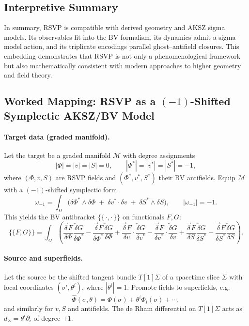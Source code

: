\documentclass[12pt]{article}
\begin{document}
\subsection{Interpretive Summary}
In summary, RSVP is compatible with derived geometry and AKSZ sigma models. Its observables fit into the BV formalism, its dynamics admit a sigma-model action, and its triplicate encodings parallel ghost–antifield closures. This embedding demonstrates that RSVP is not only a phenomenological framework but also mathematically consistent with modern approaches to higher geometry and field theory.

\subsection*{Worked Mapping: RSVP as a $(-1)$-Shifted Symplectic AKSZ/BV Model}

\paragraph{Target data (graded manifold).}
Let the target be a graded manifold $\mathcal M$ with degree assignments
\[
|\Phi|=|v|=|S|=0,\qquad
|\Phi^\ast|=|v^\ast|=|S^\ast|=-1,
\]
where $(\Phi,v,S)$ are RSVP fields and $(\Phi^\ast,v^\ast,S^\ast)$ their BV antifields. Equip $\mathcal M$ with a $(-1)$-shifted symplectic form
\begin{equation}
\omega_{-1}
=\int_\Omega \big(\delta \Phi^\ast \wedge \delta \Phi
\;+\; \delta v^\ast \!\cdot\! \delta v
\;+\; \delta S^\ast \wedge \delta S\big),
\qquad |\omega_{-1}|=-1.
\end{equation}
This yields the BV antibracket $\{\!\{\,\cdot,\cdot\,\}\!\}$ on functionals $F,G$:
\begin{equation}
\{\!\{F,G\}\!\}
=\int_\Omega\!\left(
\frac{\overrightarrow{\delta} F}{\delta \Phi}\frac{\overleftarrow{\delta} G}{\delta \Phi^\ast}
-\frac{\overrightarrow{\delta} F}{\delta \Phi^\ast}\frac{\overleftarrow{\delta} G}{\delta \Phi}
+\frac{\overrightarrow{\delta} F}{\delta v}\!\cdot\!\frac{\overleftarrow{\delta} G}{\delta v^\ast}
-\frac{\overrightarrow{\delta} F}{\delta v^\ast}\!\cdot\!\frac{\overleftarrow{\delta} G}{\delta v}
+\frac{\overrightarrow{\delta} F}{\delta S}\frac{\overleftarrow{\delta} G}{\delta S^\ast}
-\frac{\overrightarrow{\delta} F}{\delta S^\ast}\frac{\overleftarrow{\delta} G}{\delta S}
\right).
\end{equation}

\paragraph{Source and superfields.}
Let the source be the shifted tangent bundle $T[1]\Sigma$ of a spacetime slice $\Sigma$ with local coordinates $(\sigma^i,\theta^i)$, where $|\theta^i|=1$. Promote fields to superfields, e.g.
\[
\widehat{\Phi}(\sigma,\theta)=\Phi(\sigma)+\theta^i \Phi_i(\sigma)+\cdots,
\]
and similarly for $v,S$ and antifields. The de Rham differential on $T[1]\Sigma$ acts as $d_\Sigma=\theta^i\partial_i$ of degree $+1$.
\end{document}

